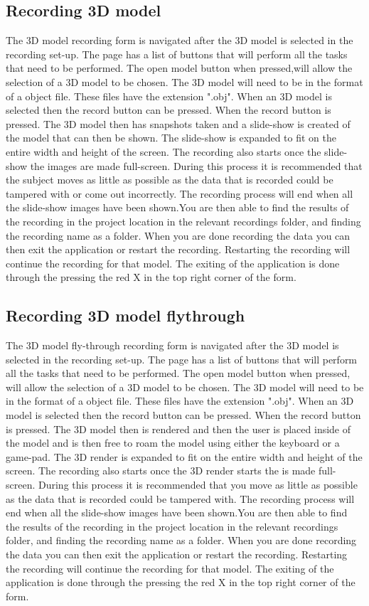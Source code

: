 \subsection{Recording 3D model}
The 3D model recording form is navigated after the 3D model is selected in the recording set-up. The page has a list of buttons that will perform all the tasks that need to be performed. The open model button when pressed,will allow the selection of a 3D model to be chosen. The 3D model will need to be in the format of a object file. These files have the extension ".obj". When an 3D model is selected then the record button can be pressed. When the record button is pressed. The 3D model then has snapshots taken and a slide-show is created of the model that can then be shown. The slide-show is expanded to fit on the entire width and height of the screen. The recording also starts once the slide-show the images are made full-screen. During this process it is recommended that the subject moves as little as possible as the data that is recorded could be tampered with or come out incorrectly. The recording process will end when all the slide-show images have been shown.You are then able to find the results of the recording in the project location in the relevant recordings folder, and finding the recording name as a folder. When you are done recording the data you can then exit the application or restart the recording. Restarting the recording will continue the recording for that model. The exiting of the application is done through the pressing the red X in the top right corner of the form.

\subsection{Recording 3D model flythrough}
The 3D model fly-through recording form is navigated after the 3D model is selected in the recording set-up. The page has a list of buttons that will perform all the tasks that need to be performed. The open model button when pressed, will allow the selection of a 3D model to be chosen. The 3D model will need to be in the format of a object file. These files have the extension ".obj". When an 3D model is selected then the record button can be pressed. When the record button is pressed. The 3D model then is rendered and then the user is placed inside of the model and is then free to roam the model using either the keyboard or a game-pad. The 3D render is expanded to fit on the entire width and height of the screen. The recording also starts once the 3D render starts the is made full-screen. During this process it is recommended that you move as little as possible as the data that is recorded could be tampered with. The recording process will end when all the slide-show images have been shown.You are then able to find the results of the recording in the project location in the relevant recordings folder, and finding the recording name as a folder. When you are done recording the data you can then exit the application or restart the recording. Restarting the recording will continue the recording for that model. The exiting of the application is done through the pressing the red X in the top right corner of the form.


